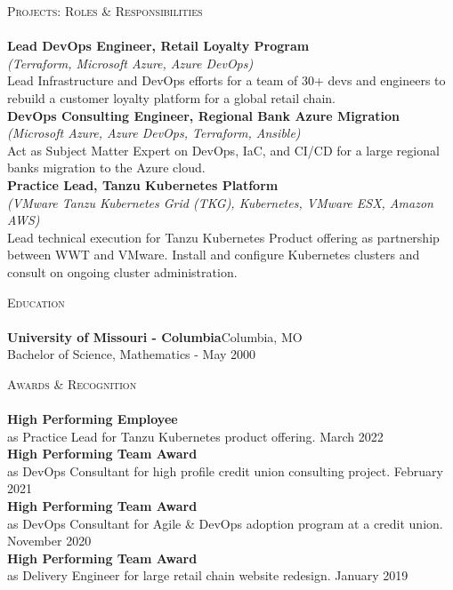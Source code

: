 \documentclass[letterpaper]{article}
\newcommand{\lineunder} {
    \vspace*{-8pt} \\
    \hspace*{-18pt} \hrulefill \\
}
\newcommand{\header} [1] {
    {\hspace*{-18pt}\vspace*{6pt} \textsc{#1}}
    \vspace*{-6pt} \lineunder
}
\begin{document}
\pagebreak
\header{Projects: Roles \& Responsibilities}
{\textbf{Lead DevOps Engineer, Retail Loyalty Program}} \\
{\sl (Terraform, Microsoft Azure, Azure DevOps)} \\
Lead Infrastructure and DevOps efforts for a team of 30+ devs and engineers to rebuild a customer loyalty platform for a global retail chain.\\
\vspace*{2mm}
{\textbf{DevOps Consulting Engineer, Regional Bank Azure Migration}} \\
{\sl (Microsoft Azure, Azure DevOps, Terraform, Ansible)} \\
Act as Subject Matter Expert on DevOps, IaC, and CI/CD for a large regional bank\textquotesingle{}s migration to the Azure cloud.\\
\vspace*{2mm}
{\textbf{Practice Lead, Tanzu Kubernetes Platform}} \\
{\sl (VMware Tanzu Kubernetes Grid (TKG), Kubernetes, VMware ESX, Amazon AWS)} \\
Lead technical execution for Tanzu Kubernetes Product offering as partnership between WWT and VMware. Install and configure Kubernetes clusters and consult on ongoing cluster administration.\\
\vspace*{2mm}

\header{Education}
\textbf{University of Missouri - Columbia}\hfill Columbia, MO\\
Bachelor of Science, Mathematics \hfill  - May 2000\\
\vspace{2mm}

\header{Awards \& Recognition}
\textbf{High Performing Employee}\\
as Practice Lead for Tanzu Kubernetes product offering. \hfill March 2022\\
\vspace*{2mm}
\textbf{High Performing Team Award}\\
as DevOps Consultant for high profile credit union consulting project. \hfill February 2021\\
\vspace*{2mm}
\textbf{High Performing Team Award}\\
as DevOps Consultant for Agile \& DevOps adoption program at a credit union. \hfill November 2020\\
\vspace*{2mm}
\textbf{High Performing Team Award}\\
as Delivery Engineer for large retail chain website redesign. \hfill January 2019\\
\vspace*{2mm}

\ 
\end{document}
